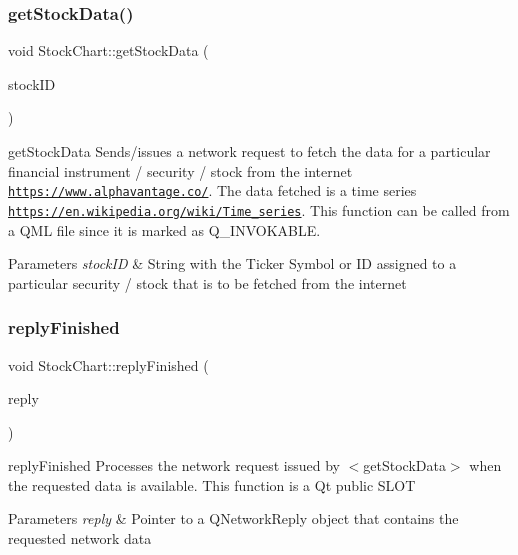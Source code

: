 \subsubsection{\texorpdfstring{get\+Stock\+Data()}{getStockData()}}
{\footnotesize\ttfamily void Stock\+Chart\+::get\+Stock\+Data (\begin{DoxyParamCaption}\item[{const Q\+String \&}]{stock\+ID }\end{DoxyParamCaption})}



get\+Stock\+Data Sends/issues a network request to fetch the data for a particular financial instrument / security / stock from the internet \href{https://www.alphavantage.co/}{\tt https\+://www.\+alphavantage.\+co/}. The data fetched is a time series \href{https://en.wikipedia.org/wiki/Time_series}{\tt https\+://en.\+wikipedia.\+org/wiki/\+Time\+\_\+series}. This function can be called from a Q\+ML file since it is marked as Q\+\_\+\+I\+N\+V\+O\+K\+A\+B\+LE. 


\begin{DoxyParams}{Parameters}
{\em stock\+ID} & String with the Ticker Symbol or ID assigned to a particular security / stock that is to be fetched from the internet \\
\hline
\end{DoxyParams}
\mbox{\label{class_stock_chart_a2521c5991cca0803f5890e23d90672da}} 
\subsubsection{\texorpdfstring{reply\+Finished}{replyFinished}}
{\footnotesize\ttfamily void Stock\+Chart\+::reply\+Finished (\begin{DoxyParamCaption}\item[{Q\+Network\+Reply $\ast$}]{reply }\end{DoxyParamCaption})\hspace{0.3cm}{\ttfamily [slot]}}



reply\+Finished Processes the network request issued by $<$get\+Stock\+Data$>$ when the requested data is available. This function is a Qt public S\+L\+OT 


\begin{DoxyParams}{Parameters}
{\em reply} & Pointer to a Q\+Network\+Reply object that contains the requested network data \\
\hline
\end{DoxyParams}
\mbox{\label{class_stock_chart_a99d57c44a0bd5e91e2e810bec071f7db}} 

